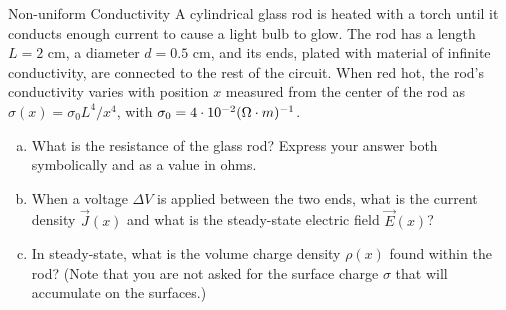 \documentclass{esg8022pset}
\renewcommand{\d}{\,d}
\begin{document}
\begin{problem}{Non-uniform Conductivity}
  A cylindrical glass rod is heated with a torch until it conducts enough current to cause a light bulb to glow. The rod has a length $L = 2$ cm, a diameter $d = 0.5$ cm, and its ends, plated with material of infinite conductivity, are connected to the rest of the circuit. When red hot, the rod's conductivity varies with position $x$ measured from the center of the rod as $\sigma(x) = \sigma_0 L^4 / x^4$, with $\sigma_0 = 4 \cdot 10^{-2} (\Omega\cdot{\rm m})^{-1}$.
  \begin{enumerate}[(a)]
    \item What is the resistance of the glass rod? Express your answer both symbolically and as a value in ohms.
    \item When a voltage $\Delta V$ is applied between the two ends, what is the current density $\vec J(x)$ and what is the steady-state electric field $\vec E(x)$?
    \item In steady-state, what is the volume charge density $\rho(x)$ found within the rod? (Note that you are not asked for the surface charge $\sigma$ that will accumulate on the surfaces.)
  \end{enumerate}
\end{problem}
\begin{solution}
  
\end{solution}
\end{document}

